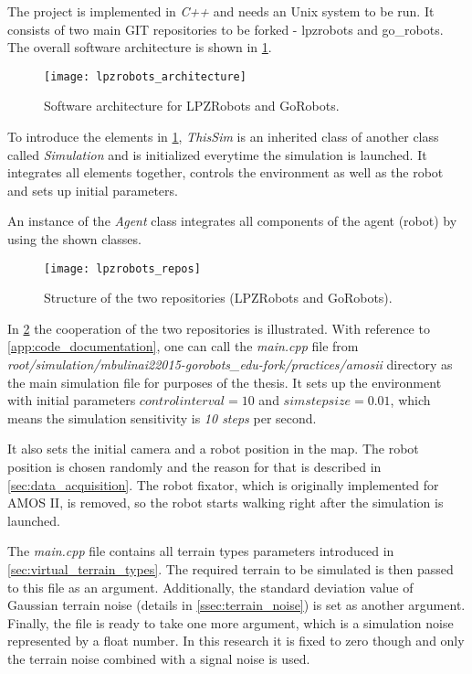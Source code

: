 The project is implemented in \textit{C++} and needs an Unix system to be run. It consists of two main GIT repositories to be forked - lpzrobots and go\_robots. The overall software architecture is shown in \cref{img:lpzrobots_architecture}.

\begin{figure}[H]
  \centering
  \texttt{[image: lpzrobots\_architecture]}
  \caption{Software architecture for LPZRobots and GoRobots. \citep{misc:lpzrobots}}
  \label{img:lpzrobots_architecture}
\end{figure}

To introduce the elements in \cref{img:lpzrobots_architecture}, \textit{ThisSim} is an inherited class of another class called \textit{Simulation} and is initialized everytime the simulation is launched. It integrates all elements together, controls the environment as well as the robot and sets up initial parameters.

An instance of the \textit{Agent} class integrates all components of the agent (robot) by using the shown classes.

\begin{figure}[H]
  \centering
  \texttt{[image: lpzrobots\_repos]}
  \caption{Structure of the two repositories (LPZRobots and GoRobots). \citep{misc:lpzrobots}}
  \label{img:lpzrobots_repos}
\end{figure}

In \cref{img:lpzrobots_repos} the cooperation of the two repositories is illustrated. With reference to \cref{app:code_documentation}, one can call the \textit{main.cpp} file from \textit{root/simulation/mbulinai22015-gorobots\_edu-fork/practices/amosii} directory as the main simulation file for purposes of the thesis. It sets up the environment with initial parameters $ controlinterval = 10 $ and $ simstepsize = 0.01 $, which means the simulation sensitivity is \textit{10 steps} per second.

It also sets the initial camera and a robot position in the map. The robot position is chosen randomly and the reason for that is described in \cref{sec:data_acquisition}. The robot fixator, which is originally implemented for AMOS II, is removed, so the robot starts walking right after the simulation is launched.

The \textit{main.cpp} file contains all terrain types parameters introduced in \cref{sec:virtual_terrain_types}. The required terrain to be simulated is then passed to this file as an argument. Additionally, the standard deviation value of Gaussian terrain noise (details in \cref{ssec:terrain_noise}) is set as another argument. Finally, the file is ready to take one more argument, which is a simulation noise represented by a float number. In this research it is fixed to zero though and only the terrain noise combined with a signal noise is used.

